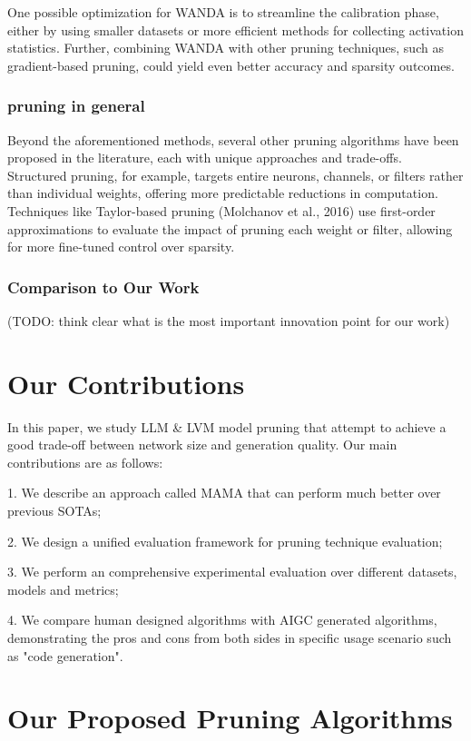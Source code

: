 \documentclass{article} %
\begin{document}
One possible optimization for WANDA is to streamline the calibration phase, either by using smaller datasets or more efficient methods for collecting activation statistics. Further, combining WANDA with other pruning techniques, such as gradient-based pruning, could yield even better accuracy and sparsity outcomes.

\subsubsection{pruning in general}

Beyond the aforementioned methods, several other pruning algorithms have been proposed in the literature, each with unique approaches and trade-offs. Structured pruning, for example, targets entire neurons, channels, or filters rather than individual weights, offering more predictable reductions in computation. Techniques like Taylor-based pruning (Molchanov et al., 2016) use first-order approximations to evaluate the impact of pruning each weight or filter, allowing for more fine-tuned control over sparsity.

\subsubsection{Comparison to Our Work}

(TODO: think clear what is the most important innovation point for our work)

\section{Our Contributions}
\label{contribution}

In this paper, we study LLM \& LVM model pruning that attempt to achieve a good trade-off between network size and generation quality. Our main contributions are as follows:

1. We describe an approach called MAMA that can perform much better over previous SOTAs;

2. We design a unified evaluation framework for pruning technique evaluation;

3. We perform an comprehensive experimental evaluation over different datasets, models and metrics;

4. We compare human designed algorithms with AIGC generated algorithms, demonstrating the pros and cons from both sides in specific usage scenario such as "code generation".

\section{Our Proposed Pruning Algorithms}
\label{ours}
\end{document}
